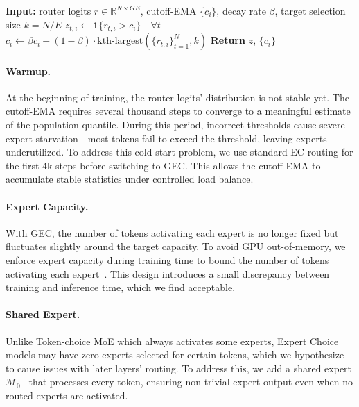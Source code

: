 \documentclass{article}
\theoremstyle{plain}
\theoremstyle{definition}
\theoremstyle{remark}
\begin{document}
\begin{algorithm}[t]
\caption{Global Expert Choice Routing}
\label{alg:gec}
\begin{algorithmic}[1]
\STATE \textbf{Input:} router logits $r \in \mathbb{R}^{N \times GE}$, cutoff-EMA $\{c_i\}$, decay rate $\beta$, target selection size $k= N/E$
    \STATE $z_{t,i} \gets \mathbf{1}\{r_{t,i} > c_i\} \quad \forall t$ 
        \STATE $c_i \gets \beta c_i + (1-\beta)\cdot \text{kth-largest}(\{r_{t,i}\}_{t=1}^{N}, k)$
    \ENDIF
\ENDFOR
\STATE \textbf{Return} $z$, $\{c_i\}$
\end{algorithmic}
\end{algorithm}

\paragraph{Warmup.} At the beginning of training, the router logits' distribution is not stable yet. The cutoff-EMA requires several thousand steps to converge to a meaningful estimate of the population quantile. During this period, incorrect thresholds cause severe expert starvation—most tokens fail to exceed the threshold, leaving experts underutilized. To address this cold-start problem, we use standard EC routing for the first 4k steps before switching to GEC. This allows the cutoff-EMA to accumulate stable statistics under controlled load balance.

\paragraph{Expert Capacity.} With GEC, the number of tokens activating each expert is no longer fixed but fluctuates slightly around the target capacity. To avoid GPU out-of-memory, we enforce expert capacity during training time to bound the number of tokens activating each expert~\cite{fedus2022switch}. This design introduces a small discrepancy between training and inference time, which we find acceptable.

\paragraph{Shared Expert.} Unlike Token-choice MoE which always activates some experts, Expert Choice models may have zero experts selected for certain tokens, which we hypothesize to cause issues with later layers' routing. To address this, we add a shared expert $\mathcal{M}_0$~\cite{dai2024deepseek, komatsuzaki2023sparse} that processes every token, ensuring non-trivial expert output even when no routed experts are activated.
\end{document}
